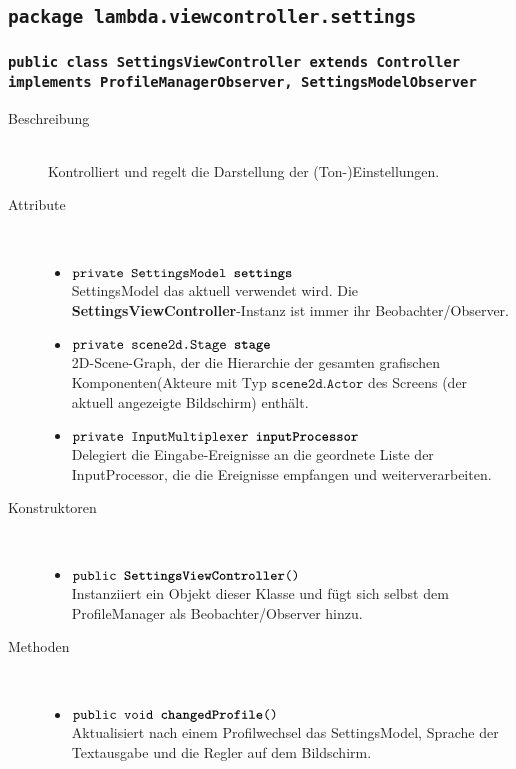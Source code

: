 \subsection{\texttt{package lambda.viewcontroller.settings}}

\subsubsection{\normalfont \texttt{public class \textbf{SettingsViewController} extends Controller implements ProfileManagerObserver, SettingsModelObserver}}

\begin{description}
\item[Beschreibung] \hfill \\ Kontrolliert und regelt die Darstellung der (Ton-)Einstellungen.
\item[Attribute] \hfill \\
	\vspace{-.8cm}
	\begin{itemize}
		\item $\texttt{private SettingsModel \textbf{settings}}$ \\ SettingsModel das aktuell verwendet wird. Die \textbf{SettingsViewController}-Instanz ist immer ihr Beobachter/Observer.
		\item $\texttt{private scene2d.Stage \textbf{stage}}$ \\ 2D-Scene-Graph, der die Hierarchie der gesamten grafischen Komponenten(Akteure mit Typ $\texttt{scene2d.Actor}$ des Screens (der aktuell angezeigte Bildschirm) enthält. 
		\item $\texttt{private InputMultiplexer \textbf{inputProcessor}}$ \\ Delegiert die Eingabe-Ereignisse an die geordnete Liste der InputProcessor, die die Ereignisse empfangen und weiterverarbeiten.
	\end{itemize}
	
\item[Konstruktoren] \hfill \\
	\vspace{-.8cm}
	\begin{itemize}
		\item $\texttt{public \textbf{SettingsViewController}()}$ \\ Instanziiert ein Objekt dieser Klasse und fügt sich selbst dem ProfileManager als Beobachter/Observer hinzu.
	\end{itemize}
	
\item[Methoden] \hfill \\
	\vspace{-.8cm}
	\begin{itemize}		
		\item $\texttt{public void \textbf{changedProfile}()}$ \\ Aktualisiert nach einem Profilwechsel das SettingsModel, Sprache der Textausgabe und die Regler auf dem Bildschirm.
				

\end{itemize}
\end{description}
